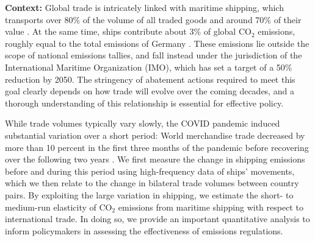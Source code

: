 \documentclass[hidelinks, 12pt,letterpaper]{article}
\begin{document}
\noindent \textbf{Context:} 
Global trade is intricately linked with maritime shipping, which transports over 80\% of the volume of all traded goods and around 70\% of their value \citep{unctad2017review}.
At the same time, ships contribute about 3\% of global CO$_2$ emissions, roughly equal to the total emissions of Germany \citep{faber2020fourth}. These emissions lie outside the scope of national emissions tallies, and fall instead under the jurisdiction of the International Maritime Organization (IMO), which has set a target of a 50\% reduction by 2050. %
The stringency of abatement actions required to meet this goal clearly depends on how trade will evolve over the coming decades, and a thorough understanding of this relationship is essential for effective policy.  %

While trade volumes typically vary slowly, the COVID pandemic induced substantial variation over a short period:
World merchandise trade decreased by more than 10 percent in the first three months of the pandemic before recovering over the following two years \citep{oecd21}. %
We first measure the change in shipping emissions before and during this period using high-frequency data of ships' movements, which we then relate to the change in bilateral trade volumes between country pairs. By exploiting the large variation in shipping, we estimate the short- to medium-run elasticity of CO$_2$ emissions from maritime shipping with respect to international trade. In doing so, we provide an
important quantitative analysis to inform policymakers in assessing the effectiveness of emissions regulations.  %
\end{document}
